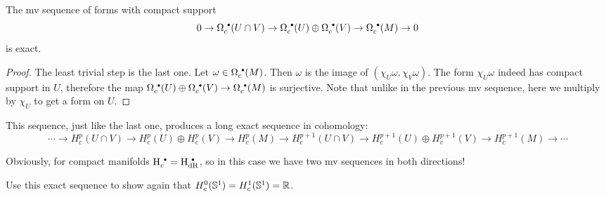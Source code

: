 \begin{prop}
    The \gls{mv} sequence of forms with compact support
    \[0\to \Omega_c^{\smbullet }(U\cap V)\to \Omega_c^{\smbullet }(U)\oplus\Omega_c^{\smbullet }(V)\to \Omega_c^{\smbullet }(M)\to 0\]
    is exact.
\end{prop}
\begin{proof}
    The least trivial step is the last one. Let $\omega\in\Omega_c^{\smbullet }(M)$. Then $\omega$ is the image of $(\chi_U\omega,\chi_V\omega)$. The form $\chi_U\omega$ indeed has compact support in $U$, therefore the map $\Omega_c^{\smbullet }(U)\oplus\Omega_c^{\smbullet }(V)\to \Omega_c^{\smbullet }(M)$ is surjective. Note that unlike in the previous \gls{mv} sequence, here we multiply by $\chi_U$ to get a form on $U$.
\end{proof}

This sequence, just like the last one, produces a long exact sequence in cohomology:
\[
\scriptstyle
\cdots\to H_c^p(U\cap V)\to H_c^p(U)\oplus H_c^p(V)\to H_c^p(M)\to H_c^{p+1}(U\cap V)\to H_c^{p+1}(U)\oplus H_c^{p+1}(V)\to H_c^{p+1}(M)\to \cdots
\]

Obviously, for compact manifolds $\rmH^{\smbullet }_c=\rmH^{\smbullet }_{\rm dR}$, so in this case we have two \gls{mv} sequences in both directions!

\begin{xca}
    Use this exact sequence to show again that $H_c^0(\mathbb{S}^1)=H_c^1(\mathbb{S}^1)=\mathbb{R}$.
\end{xca}

